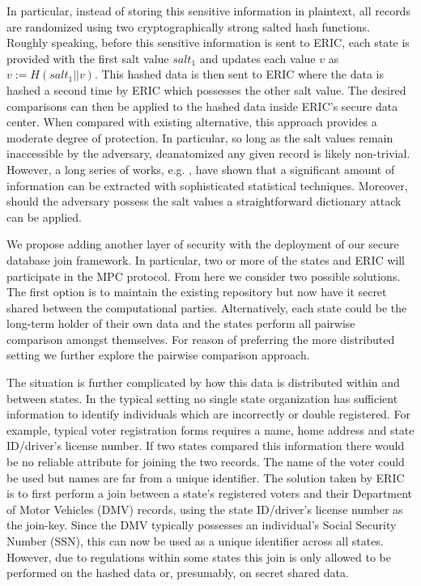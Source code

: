 \documentclass[11pt,letterpaper]{article}
\begin{document}
In particular, instead of storing this sensitive information in plaintext, all records are randomized using two cryptographically strong salted hash functions. Roughly speaking, before this sensitive information is sent to ERIC, each state is provided with the first salt value $salt_1$ and updates each value $v$ as $v := H(salt_1 || v)$. This hashed data is then sent to ERIC where the data is hashed a second time by ERIC which possesses the other salt value. The desired comparisons can then be applied to the hashed data inside ERIC's secure data center. When compared with existing alternative, this approach provides a moderate degree of protection. In particular, so long as the salt values remain inaccessible by the adversary, deanatomized any given record is likely non-trivial. However, a long series of works, e.g. \cite{deanon0,deanon1,deanon2,deanon3,deanon4}, have shown that a significant amount of information can be extracted with sophisticated statistical techniques. Moreover, should the adversary possess the salt values a straightforward dictionary attack can be applied.

We propose adding another layer of security with the deployment of our secure database join framework. In particular, two or more of the states and ERIC will participate in the MPC protocol. From here we consider two possible solutions. The first option is to maintain the existing repository but now have it secret shared between the computational parties. Alternatively, each state could be the long-term holder of their own data and the states perform all pairwise comparison amongst themselves. For reason of preferring the more distributed setting we further explore the pairwise comparison approach. 

The situation is further complicated by how this data is distributed within and between states. In the typical setting no single state organization has sufficient information to identify individuals which are incorrectly or double registered. For example, typical voter registration forms requires a name, home address and state ID/driver's license number. If two states compared this information there would be no reliable attribute for joining the two records. The name of the voter could be used but names are far from a unique identifier. The solution taken by ERIC is to first perform a join between a state's registered voters and their Department of Motor Vehicles (DMV) records, using the  state ID/driver's license number as the join-key. Since the DMV typically possesses an individual's Social Security Number (SSN), this can now be used as a unique identifier across all states. However, due to regulations within some states this join is only allowed to be performed on the hashed data or, presumably, on secret shared data.
\end{document}
